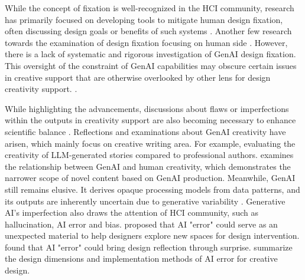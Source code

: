 While the concept of fixation is well-recognized in the HCI community, research has primarily focused on developing tools to mitigate human design fixation, often discussing design goals or benefits of such systems \cite{yoo2024bi, lee2024conversational, chung2022artistic, lamiroy2022lamuse}. Another few research towards the examination of design fixation focusing on human side \cite{wadinambiarachchi2024effects}. However, there is a lack of systematic and rigorous investigation of GenAI design fixation. This oversight of the constraint of GenAI capabilities may obscure certain issues in creative support that are otherwise overlooked by other lens for design creativity support. \cite{li2023beyond, frich2019mapping, frich2018twenty}.




While highlighting the advancements, discussions about flaws or imperfections within the outputs in creativity support are also becoming necessary to enhance scientific balance \cite{weisz2024design}. Reflections and examinations about GenAI creativity have arisen, which mainly focus on creative writing area. For example, \cite{chakrabarty2024art} evaluating the creativity of LLM-generated stories compared to professional authors. \cite{doshi2024generative} examines the relationship between GenAI and human creativity, which demonstrates the narrower scope of novel content based on GenAI production. Meanwhile, GenAI still remains elusive. It derives opaque processing models from data patterns, and its outputs are inherently uncertain due to generative variability \cite{weisz2023toward, weisz2024design}. Generative AI's imperfection also draws the attention of HCI community, such as hallucination, AI error and bias. \cite{benjamin2021machine} proposed that AI "error" could serve as an unexpected material to help designers explore new spaces for design intervention. \cite{van2022ceci} found that AI "error" could bring design reflection through surprise. \cite{liu2024smart} summarize the design dimensions and implementation methods of AI error for creative design.

